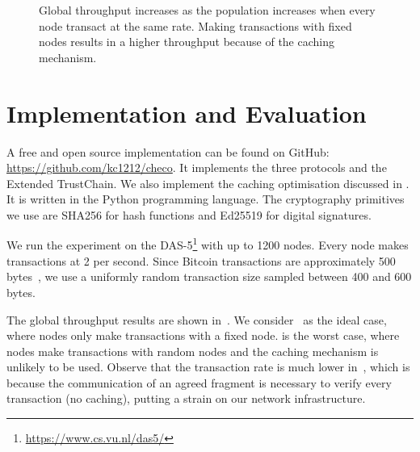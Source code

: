 \begin{figure*}[ht]
  \centering
  \caption{Global throughput increases as the population increases when every node transact at the same rate.
  Making transactions with fixed nodes results in a higher throughput because of the caching mechanism.}
  \label{fig:global-throughput}
\end{figure*}

\section{Implementation and Evaluation}
\label{sec:implementation}

A free and open source implementation can be found on GitHub: \url{https://github.com/kc1212/checo}.
It implements the three protocols and the Extended TrustChain.
We also implement the caching optimisation discussed in .
It is written in the Python programming language.
The cryptography primitives we use are SHA256 for hash functions and Ed25519 for digital signatures.

We run the experiment on the DAS-5\footnote{\url{https://www.cs.vu.nl/das5/}} with up to 1200 nodes.
Every node makes transactions at 2 per second.
Since Bitcoin transactions are approximately 500 bytes~\cite{txsize},
we use a uniformly random transaction size sampled between 400 and 600 bytes.

The global throughput results are shown in~.
We consider~ as the ideal case,
where nodes only make transactions with a fixed node.
 is the worst case,
where nodes make transactions with random nodes and the caching mechanism is unlikely to be used.
Observe that the transaction rate is much lower in~,
which is because the communication of an agreed fragment is necessary to verify every transaction (no caching),
putting a strain on our network infrastructure.

